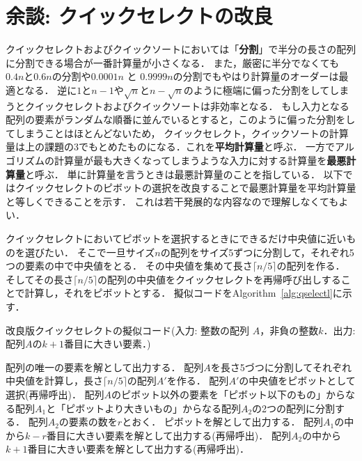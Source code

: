 \documentclass[a4paper,twoside,onecolumn,openany,article]{memoir}
\theoremstyle{remark}
\begin{document}
\section*{余談: クイックセレクトの改良}
クイックセレクトおよびクイックソートにおいては「\textbf{分割}」で半分の長さの配列に分割できる場合が一番計算量が小さくなる．
また，厳密に半分でなくても$0.4 n$と$0.6n$の分割や$0.0001 n$ と $0.9999 n$の分割でもやはり計算量のオーダーは最適となる．
逆に$1$と$n-1$や$\sqrt{n}$と$n-\sqrt{n}$のように極端に偏った分割をしてしまうとクイックセレクトおよびクイックソートは非効率となる．
もし入力となる配列の要素がランダムな順番に並んでいるとすると，このように偏った分割をしてしまうことはほとんどないため，
クイックセレクト，クイックソートの計算量は上の課題の3でもとめたものになる．これを\textbf{平均計算量}と呼ぶ．
一方でアルゴリズムの計算量が最も大きくなってしまうような入力に対する計算量を\textbf{最悪計算量}と呼ぶ．
単に計算量を言うときは最悪計算量のことを指している．
以下ではクイックセレクトのピボットの選択を改良することで最悪計算量を平均計算量と等しくできることを示す．
これは若干発展的な内容なので理解しなくてもよい．

クイックセレクトにおいてピボットを選択するときにできるだけ中央値に近いものを選びたい．
そこで一旦サイズ$n$の配列をサイズ5ずつに分割して，それぞれ5つの要素の中で中央値をとる．
その中央値を集めて長さ$\lceil n/5\rceil$の配列を作る．
そしてその長さ$\lceil n/5\rceil$の配列の中央値をクイックセレクトを再帰呼び出しすることで計算し，それをピボットとする．
擬似コードをAlgorithm~\ref{alg:qselectl}に示す．

\begin{algorithm}
\caption{改良版クイックセレクトの擬似コード(入力: 整数の配列 $A$，非負の整数$k$．出力: 配列$A$の$k+1$番目に大きい要素．)}
\label{alg:qselectl}
\begin{algorithmic}
  \State 配列の唯一の要素を解として出力する．
\Else
  \State 配列$A$を長さ5づつに分割してそれぞれ中央値を計算し，長さ$\lceil n/5\rceil$の配列$A'$を作る．
  \State 配列$A'$の中央値をピボットとして選択(再帰呼出)．
  \State 配列$A$のピボット以外の要素を「ピボット以下のもの」からなる配列$A_1$と「ピボットより大きいもの」からなる配列$A_2$の2つの配列に分割する．
  \State 配列$A_2$の要素の数を$r$とおく．
    \State ピボットを解として出力する．
    \State 配列$A_1$の中から$k-r$番目に大きい要素を解として出力する(再帰呼出)．
  \Else
    \State 配列$A_2$の中から$k+1$番目に大きい要素を解として出力する(再帰呼出)．
  \EndIf
\EndIf
\end{algorithmic}
\end{algorithm}
\end{document}

